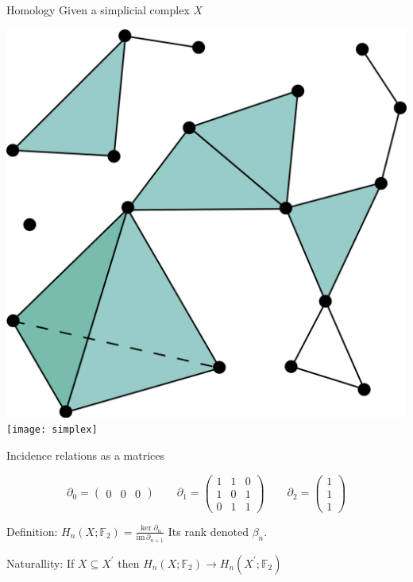 \documentclass[10pt,t, handout]{beamer} %
\begin{document}
\begin{frame}[c]{Homology}
	Given a simplicial complex $X$
	\begin{center}
		\includegraphics[scale=.05]{simplicial_complex}
		\qquad\qquad
		\pause
		\texttt{[image: simplex]}
	\end{center}
	
	Incidence relations as a matrices
	
	\begin{equation*}
	\partial_0 =
	\begin{pmatrix}
	0 & 0 & 0 
	\end{pmatrix}
	\qquad
	\partial_1 =
	\begin{pmatrix}
	1 & 1 & 0 \\
	1 & 0 & 1 \\
	0 & 1 & 1 
	\end{pmatrix}
	\qquad
	\partial_2 =
	\begin{pmatrix}
	1 \\
	1 \\
	1 
	\end{pmatrix}
	\end{equation*}
	
	\vskip 5pt
	\pause
	
	\textcolor{pblue}{Definition:} $\displaystyle{H_n(X; \mathbb F_2) = \frac{\ker \partial_n}{\mathrm{im}\, \partial_{n+1}}}$ \quad Its rank denoted $\beta_n$.
	
	\vskip 15pt
	\pause
	
	\textcolor{pblue}{Naturallity:}	
	If $X \subseteq X^\prime$ then $H_n(X; \mathbb F_2) \to H_n(X^\prime; \mathbb F_2)$
\end{frame}
\end{document}
